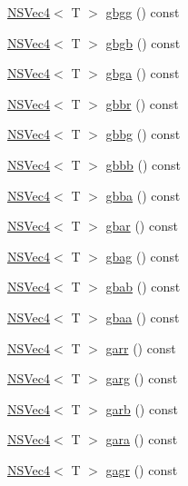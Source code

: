 \begin{DoxyCompactItemize}
\item 
\hyperlink{structNSVec4}{N\-S\-Vec4}$<$ T $>$ \hyperlink{structNSVec4_a22197271b56fa222f8008e64fa531574}{gbgg} () const 
\item 
\hyperlink{structNSVec4}{N\-S\-Vec4}$<$ T $>$ \hyperlink{structNSVec4_a7e105e866596cac60917c3cf218cfb54}{gbgb} () const 
\item 
\hyperlink{structNSVec4}{N\-S\-Vec4}$<$ T $>$ \hyperlink{structNSVec4_ac44fbad9fc2b2f6534d654e7da64efcc}{gbga} () const 
\item 
\hyperlink{structNSVec4}{N\-S\-Vec4}$<$ T $>$ \hyperlink{structNSVec4_a5ae2f5214ba7a15bde377287677ebdb6}{gbbr} () const 
\item 
\hyperlink{structNSVec4}{N\-S\-Vec4}$<$ T $>$ \hyperlink{structNSVec4_a46c89195ebc4327608874b4b4018d192}{gbbg} () const 
\item 
\hyperlink{structNSVec4}{N\-S\-Vec4}$<$ T $>$ \hyperlink{structNSVec4_ad7b7815c86098984e060d0631d80ded1}{gbbb} () const 
\item 
\hyperlink{structNSVec4}{N\-S\-Vec4}$<$ T $>$ \hyperlink{structNSVec4_ad6f73bfab33ef32ddfaa0aa663588088}{gbba} () const 
\item 
\hyperlink{structNSVec4}{N\-S\-Vec4}$<$ T $>$ \hyperlink{structNSVec4_a3e4569ba3f8e49d88f296361e7509384}{gbar} () const 
\item 
\hyperlink{structNSVec4}{N\-S\-Vec4}$<$ T $>$ \hyperlink{structNSVec4_a8d4b310614228a9ec961ebe78647198a}{gbag} () const 
\item 
\hyperlink{structNSVec4}{N\-S\-Vec4}$<$ T $>$ \hyperlink{structNSVec4_a2b8db9ef6cf0d134a4779777774d7e25}{gbab} () const 
\item 
\hyperlink{structNSVec4}{N\-S\-Vec4}$<$ T $>$ \hyperlink{structNSVec4_a92ff1182fe6443a23202191777893a88}{gbaa} () const 
\item 
\hyperlink{structNSVec4}{N\-S\-Vec4}$<$ T $>$ \hyperlink{structNSVec4_a0c2a8f7ffc0cc477356fcad47a33defd}{garr} () const 
\item 
\hyperlink{structNSVec4}{N\-S\-Vec4}$<$ T $>$ \hyperlink{structNSVec4_a6175fe3d405dad736a7c4a0f9b481348}{garg} () const 
\item 
\hyperlink{structNSVec4}{N\-S\-Vec4}$<$ T $>$ \hyperlink{structNSVec4_a2c323c0b0c79521be867c1a132638fd7}{garb} () const 
\item 
\hyperlink{structNSVec4}{N\-S\-Vec4}$<$ T $>$ \hyperlink{structNSVec4_a51f44bb6095b8ea26126291ae035e9f7}{gara} () const 
\item 
\hyperlink{structNSVec4}{N\-S\-Vec4}$<$ T $>$ \hyperlink{structNSVec4_a8c76e652dbc46b21a1b4c0e46fb207e1}{gagr} () const 

\end{DoxyCompactItemize}
